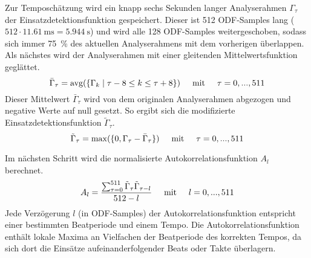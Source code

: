 {{{			%
			Zur Temposchätzung wird ein knapp sechs Sekunden langer Analyserahmen $\Gamma_\tau$ der Einsatzdetektionsfunktion gespeichert.
			Dieser ist \num{512} ODF-Samples lang ($512 \cdot \SI{11.61}{\milli\second} = \SI{5.944}{\second} $)
				und wird alle \num{128} ODF-Samples weitergeschoben,
				sodass sich immer \SI{75}{\percent} des aktuellen Analyserahmens mit dem vorherigen überlappen.
			Als nächstes wird der Analyserahmen mit einer gleitenden Mittelwertsfunktion geglättet.
			\begin{equation}
				\bar{\Gamma}_\tau = \text{avg}(\{\Gamma_k \mid \tau - 8 \leq k \leq \tau + 8 \})
				\text{\hspace{5mm}mit\hspace{5mm}} \tau = 0, ..., 511
			\end{equation}
			Dieser Mittelwert $\bar{\Gamma}_\tau$ wird von dem originalen Analyserahmen abgezogen und negative Werte auf null gesetzt.
			So ergibt sich die modifizierte Einsatzdetektionsfunktion $\tilde{\Gamma}_\tau$.
			\begin{equation}
				\tilde{\Gamma}_\tau = \max(\{0, \Gamma_\tau - \bar{\Gamma}_\tau\})
				\text{\hspace{5mm}mit\hspace{5mm}} \tau = 0, ..., 511
			\end{equation}

			Im nächsten Schritt wird die normalisierte Autokorrelationsfunktion $A_l$ berechnet.
			\begin{equation}
				A_l = \frac{\sum_{\tau = 0}^{511} \tilde{\Gamma}_\tau \tilde{\Gamma}_{\tau - l}}{512 - l}
				\text{\hspace{5mm}mit\hspace{5mm}} l = 0, ..., 511
			\end{equation}
			Jede Verzögerung $l$ (in ODF-Samples) der Autokorrelationsfunktion entspricht einer bestimmten Beatperiode und einem Tempo.
			Die Autokorrelationsfunktion enthält lokale Maxima an Vielfachen der Beatperiode des korrekten Tempos,
				da sich dort die Einsätze aufeinanderfolgender Beats oder Takte überlagern.

}}}
